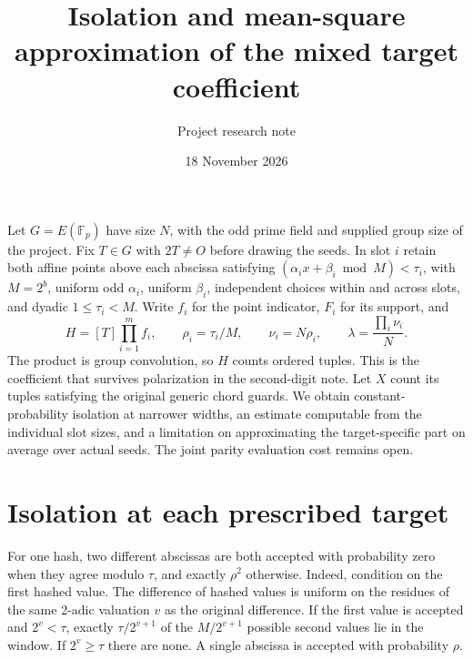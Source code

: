 \documentclass[11pt]{article}
\title{Isolation and mean-square approximation of the mixed target coefficient}
\author{Project research note}
\date{18 November 2026}
\begin{document}
\maketitle

Let $G=E(\mathbb F_p)$ have size $N$, with the odd prime field and
supplied group size of the project. Fix $T\in G$ with $2T\ne O$ before
drawing the seeds. In slot $i$ retain both affine points above each
abscissa satisfying $(\alpha_i x+\beta_i\bmod M)<\tau_i$, with
$M=2^b$, uniform odd $\alpha_i$, uniform $\beta_i$, independent choices
within and across slots, and dyadic $1\le\tau_i<M$. Write $f_i$ for the
point indicator, $F_i$ for its support, and
\[
 H=[T]\prod_{i=1}^m f_i,\qquad \rho_i=\tau_i/M,\qquad
 \nu_i=N\rho_i,\qquad \lambda=\frac{\prod_i\nu_i}{N}.
\]
The product is group convolution, so $H$ counts ordered tuples. This
is the coefficient that survives polarization in the second-digit note.
Let $X$ count its tuples satisfying the original generic chord guards.
We obtain constant-probability isolation at narrower widths, an
estimate computable from the individual slot sizes, and a limitation
on approximating the target-specific part on average over actual seeds.
The joint parity evaluation cost remains open.

\section{Isolation at each prescribed target}

For one hash, two different abscissas are both accepted with probability
zero when they agree modulo $\tau$, and exactly $\rho^2$ otherwise.
Indeed, condition on the first hashed value. The difference of hashed
values is uniform on the residues of the same 2-adic valuation $v$ as
the original difference. If the first value is accepted and
$2^v<\tau$, exactly $\tau/2^{v+1}$ of the $M/2^{v+1}$ possible
second values lie in the window. If $2^v\ge\tau$ there are none.
A single abscissa is accepted with probability $\rho$.
\end{document}
